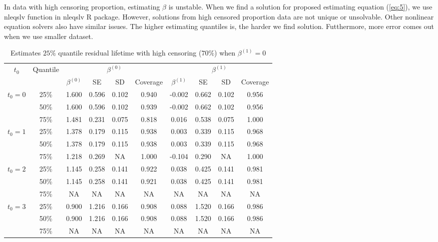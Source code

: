 \documentclass[12pt]{article}
\begin{document}
	In data with high censoring proportion, estimating $\beta$ is unstable. When we find a solution for proposed estimating equation (\ref{eq:5}), we use nleqslv function in nleqslv R package. However, solutions from high censored proportion data are not unique or unsolvable. Other nonlinear equation solvers also have similar issues. The higher estimating quantiles is, the harder we find solution. Futthermore, more error comes out when we use smaller dataset.
	
	\begin{table}[H]
		\caption{Estimates $25\%$ quantile residual lifetime with high censoring ($70\%$) when $\beta^{(1)} = 0$}
		\centering
		\begin{tabular}{|c|c|c|c|c|c|c|c|c|c|}
			\hline
			\multirow{2}{*}{$t_0$} & \multirow{2}{*}{Quantile} & \multicolumn{4}{c|}{$\beta^{(0)}$} & \multicolumn{4}{c|}{$\beta^{(1)}$}\\ \cline{3-10}
			& & $\beta^{(0)}$ & SE & SD  & Coverage  & $\beta^{(1)}$ & SE & SD & Coverage\\
			\hline\hline
			\multirow{3}{*}{$t_0=0$} & 25\% & 1.600 & 0.596 & 0.102 & 0.940 & -0.002 & 0.662 & 0.102 & 0.956 \\
			& 50\% & 1.600 & 0.596 & 0.102 & 0.939 & -0.002 & 0.662 & 0.102 & 0.956 \\ 
			& 75\% & 1.481 & 0.231 & 0.075 & 0.818 & 0.016 & 0.538 & 0.075 & 1.000 \\ 
			\hline
			\multirow{3}{*}{$t_0=1$} & 25\% & 1.378 & 0.179 & 0.115 & 0.938 & 0.003 & 0.339 & 0.115 & 0.968 \\
			& 50\% & 1.378 & 0.179 & 0.115 & 0.938 & 0.003 & 0.339 & 0.115 & 0.968 \\
			& 75\% & 1.218 & 0.269 & NA & 1.000 & -0.104 & 0.290 & NA & 1.000 \\ 
			\hline
			\multirow{3}{*}{$t_0=2$} & 25\% & 1.145 & 0.258 & 0.141 & 0.922 & 0.038 & 0.425 & 0.141 & 0.981 \\ 
			& 50\% & 1.145 & 0.258 & 0.141 & 0.921 & 0.038 & 0.425 & 0.141 & 0.981 \\ 
			& 75\% & NA & NA & NA & NA & NA & NA & NA & NA \\ 
			\hline
			\multirow{3}{*}{$t_0=3$} & 25\% & 0.900 & 1.216 & 0.166 & 0.908 & 0.088 & 1.520 & 0.166 & 0.986 \\ 
			& 50\% & 0.900 & 1.216 & 0.166 & 0.908 & 0.088 & 1.520 & 0.166 & 0.986 \\ 
			& 75\% & NA & NA & NA & NA & NA & NA & NA & NA \\ 
			\hline
		\end{tabular}
	\end{table}
\end{document}

